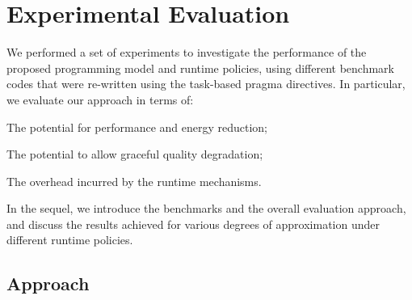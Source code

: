 \section{Experimental Evaluation}\label{sec:eval}
We performed a set of experiments to investigate the performance of the proposed programming model and runtime policies, using different benchmark codes that were re-written using the task-based pragma directives. In particular, we evaluate our approach in terms of: 
\begin{inparaenum}[(i)]
	\item The potential for performance and energy reduction;
    \item The potential to allow graceful quality degradation;
    \item The overhead incurred by the runtime mechanisms.
\end{inparaenum}
In the sequel, we introduce the benchmarks and the overall evaluation approach, and discuss the results achieved for various degrees of approximation under different runtime policies. 

\subsection{Approach}\label{sec:eval_approach}

\begin{table}[tb]
\caption{Benchmarks used for the evaluation. For all cases, except Jacobi, the approximation degree is given by the percentage of accurately executed tasks. In Jacobi, it is given by the error tolerance in convergence of the accurately executed iterations/tasks ( in the native version).} 
\label{tab:benchmarks}
\end{table}




